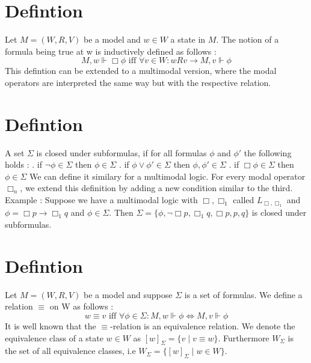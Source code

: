 \documentclass[12pt, a4paper]{scrreprt}
\begin{document}
\section{Defintion}

Let $M = (W,R,V)$ be a model and $w \in W$ a state in $M$. The notion of a formula being true at w is inductively defined as follows :
$$M, w \Vdash \Box \phi \mbox{ iff } \forall v \in W : wRv \rightarrow M,v \Vdash \phi$$
\newline
This defintion can be extended to a multimodal version, where the modal operators are interpreted the same way but with the respective relation.

\section{Defintion}
A set $\Sigma$ is closed under subformulas, if for all formulas $\phi$ and $\phi'$ the following holds :
\newline {}. if $\neg \phi \in \Sigma$ then $\phi \in \Sigma$
. if $\phi \lor \phi' \in \Sigma$ then $\phi, \phi' \in \Sigma$
. if $\Box \phi \in \Sigma$ then $\phi \in \Sigma$
\newline
\newline
We can define it similary for a multimodal logic. For every modal operator $\Box_n$, we extend this definition by adding a new condition similar to the third.
Example : Suppose we have a multimodal logic with $\Box, \Box_1$ called $L_{\Box, \Box_1}$ and $\phi = \Box p \rightarrow \Box_1 q$ and $\phi \in \Sigma$. Then $\Sigma = \{ \phi, \neg\Box p, \Box_1 q, \Box p, p, q\}$ is closed under
subformulas.

\section{Defintion}
Let $M = (W,R,V)$ be a model and suppose $\Sigma$ is a set of formulas. We define a relation $\equiv$ on W as follows : \newline 
$$w \equiv v \mbox{ iff } \forall \phi \in \Sigma : M,w \Vdash \phi \Leftrightarrow M,v \Vdash \phi$$ 
It is well known that the $\equiv$-relation is an equivalence relation. We denote the equivalence class of a state $w\in W$ as $[w]_\Sigma = \{v \mid v \equiv w\}$. Furthermore $W_\Sigma$ is the set of all equivalence classes, i.e
$W_\Sigma = \{[w]_\Sigma \mid w \in W\}$.
\end{document}
